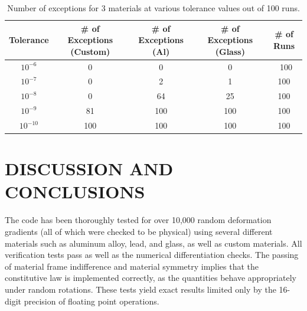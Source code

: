 \documentclass[]{spie}  %
\newcommand\Tstrut{\rule{0pt}{2.6ex}}         %
\begin{document}
\begin{table}[h]
	\centering
	\caption{Number of exceptions for 3 materials at various tolerance values out of 100 runs.}
	\begin{tabular}{ | c | c | c | c | c |}
		\hline
		Tolerance  & \# of Exceptions (Custom) & \# of Exceptions (Al) & \# of Exceptions (Glass) & \# of Runs \Tstrut \\ \hline
		$10^{-6}$  & 0   & 0   & 0   & \ 100 \Tstrut \\
		$10^{-7}$  & 0   & 2   & 1   & 100 \\
		$10^{-8}$  & 0   & 64  & 25  & 100 \\
		$10^{-9}$  & 81  & 100 & 100 & 100 \\
		$10^{-10}$ & 100 & 100 & 100 & 100 \\
		\hline
	\end{tabular}
	\label{table: tolerance}
\end{table}

\section{DISCUSSION AND CONCLUSIONS}
\label{sec: discussion}

The code has been thoroughly tested for over 10,000 random deformation gradients (all of which were checked to be physical) using several different materials such as aluminum alloy, lead, and glass, as well as custom materials. All verification tests pass as well as the numerical differentiation checks. The passing of material frame indifference and material symmetry implies that the constitutive law is implemented correctly, as the quantities behave appropriately under random rotations. These tests yield exact results limited only by the 16-digit precision of floating point operations. 
\end{document}
